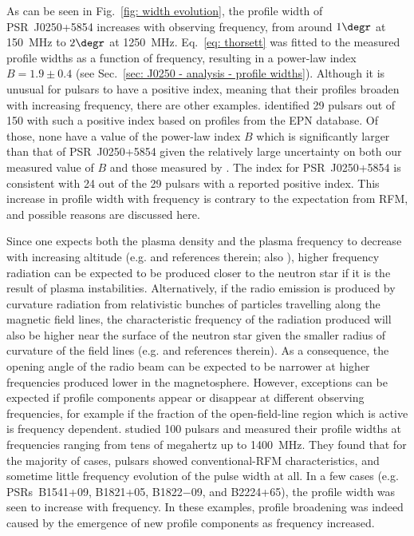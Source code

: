 As can be seen in Fig.~\ref{fig: width evolution}, the profile width of PSR~J0250+5854 increases with observing frequency, from around $1\degr$ at 150~MHz to $2\degr$ at 1250~MHz. Eq.~\eqref{eq: thorsett} was fitted to the measured profile widths as a function of frequency, resulting in a power-law index $B = 1.9\pm0.4$ (see Sec.~\ref{sec: J0250 - analysis - profile widths}). Although it is unusual for pulsars to have a positive index, meaning that their profiles broaden with increasing frequency, there are other examples. \citet{CWxx2014} identified 29 pulsars out of 150 with such a positive index based on profiles from the EPN database. Of those, none have a value of the power-law index $B$ which is significantly larger than that of PSR~J0250+5854 given the relatively large uncertainty on both our measured value of $B$ and those measured by \citet{CWxx2014}. The index for PSR~J0250+5854 is consistent with 24 out of the 29 pulsars with a reported positive index. This increase in profile width with frequency is contrary to the expectation from RFM, and possible reasons are discussed here.

Since one expects both the plasma density and the plasma frequency to decrease with increasing altitude (e.g. \citet{HAxx2001} and references therein; also \citet{GGMx2002}), higher frequency radiation can be expected to be produced closer to the neutron star if it is the result of plasma instabilities. Alternatively, if the radio emission is produced by curvature radiation from relativistic bunches of particles travelling along the magnetic field lines, the characteristic frequency of the radiation produced will also be higher near the surface of the neutron star given the smaller radius of curvature of the field lines  (e.g. \citealt{GLMx2004,DRxx2015} and references therein). As a consequence, the opening angle of the radio beam can be expected to be narrower at higher frequencies produced lower in the magnetosphere.  However, exceptions can be expected if profile components appear or disappear at different observing frequencies, for example if the fraction of the open-field-line region which is active is frequency dependent. \citet{PHS+2016} studied 100 pulsars and measured their profile widths at frequencies ranging from tens of megahertz up to 1400~MHz. They found that for the majority of cases, pulsars showed conventional-RFM characteristics, and sometime little frequency evolution of the pulse width at all. In a few cases (e.g. PSRs~B1541+09, B1821+05, B1822$-$09, and B2224+65), the profile width was seen to increase with frequency. In these examples, profile broadening was indeed caused by the emergence of new profile components as frequency increased. 

